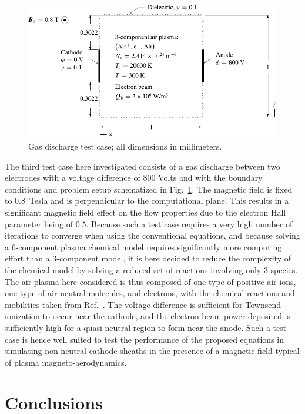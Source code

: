\documentclass[twoside,onecolumn,10pt]{waflarticle}
\newlength\lengthfigure                  %
\renewcommand{\fontsizefigure}{\footnotesize\scalefont{1.1}}
\begin{document}
%
\begin{figure}[!b]
   \fontsizefigure
   \center
   \includegraphics[width=3.5\lengthfigure]{setup_discharge.pdf}
   \caption{Gas discharge test case; all dimensions in millimeters.}
\label{fig:setup_discharge}
\end{figure}
%

The third test case here investigated consists of a gas discharge between two electrodes with a voltage difference of 800 Volts and with the boundary conditions and problem setup schematized in Fig.\ \ref{fig:setup_discharge}. The magnetic field is fixed to 0.8~Tesla and is perpendicular to the computational plane. This results in a significant magnetic field effect on the flow properties due to the electron Hall parameter being of $0.5$. Because such a test case requires a very high number of iterations to converge when using the conventional equations, and because solving a 6-component plasma chemical model requires significantly more computing effort than a 3-component model, it is here decided to reduce the complexity of the chemical model by solving a reduced set of reactions involving only 3 species. The air plasma here considered is thus composed of one type of positive air ions, one type of air neutral molecules, and electrons, with the chemical reactions and mobilities taken from Ref.\ \cite{jcp:2014:parent}. The voltage difference is sufficient for Townsend ionization to occur near the cathode, and the electron-beam power deposited is sufficiently high for a quasi-neutral region to form near the anode. Such a test case is hence well suited to test the performance of the proposed equations in simulating non-neutral cathode sheaths in the presence of a magnetic field typical of plasma magneto-aerodynamics.   




\section{Conclusions}
\end{document}
